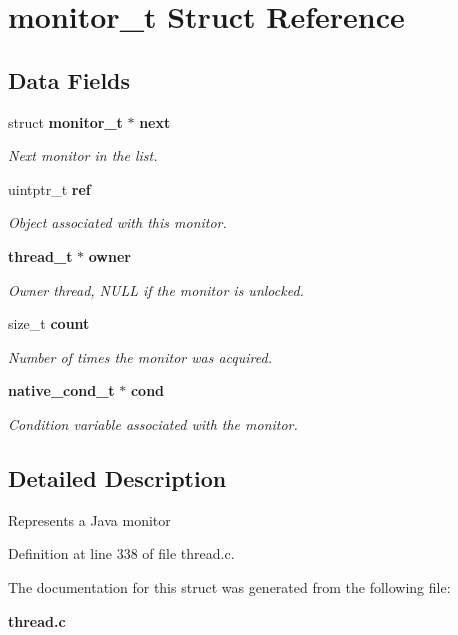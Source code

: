 \section{monitor\_\-t Struct Reference}
\label{structmonitor__t}
\subsection*{Data Fields}
\begin{DoxyCompactItemize}
\item 
struct {\bf monitor\_\-t} $\ast$ {\bf next}\label{structmonitor__t_a2b9d19abbcae80bfe2fddbd936a1380a}

\begin{DoxyCompactList}\small\item\em Next monitor in the list. \item\end{DoxyCompactList}\item 
uintptr\_\-t {\bf ref}\label{structmonitor__t_ac81af8d01fdb8bb48b8ba7901d997347}

\begin{DoxyCompactList}\small\item\em Object associated with this monitor. \item\end{DoxyCompactList}\item 
{\bf thread\_\-t} $\ast$ {\bf owner}\label{structmonitor__t_aec28adc3a660b72c8dbfbe5c9044d0cf}

\begin{DoxyCompactList}\small\item\em Owner thread, NULL if the monitor is unlocked. \item\end{DoxyCompactList}\item 
size\_\-t {\bf count}\label{structmonitor__t_af971ff0283195e45d60e657ac52b446e}

\begin{DoxyCompactList}\small\item\em Number of times the monitor was acquired. \item\end{DoxyCompactList}\item 
{\bf native\_\-cond\_\-t} $\ast$ {\bf cond}\label{structmonitor__t_ab405e53ba3c808e4726047384fcb8831}

\begin{DoxyCompactList}\small\item\em Condition variable associated with the monitor. \item\end{DoxyCompactList}\end{DoxyCompactItemize}


\subsection{Detailed Description}
Represents a Java monitor 

Definition at line 338 of file thread.c.



The documentation for this struct was generated from the following file:\begin{DoxyCompactItemize}
\item 
{\bf thread.c}\end{DoxyCompactItemize}
